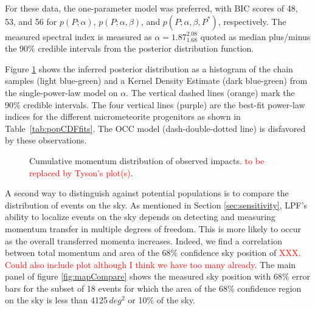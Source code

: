 \documentclass[twocolumn, trackchanges]{aastex62}
\newcommand{\red}[1]{\textcolor{red}{#1}}
\begin{document}
For these data, the one-parameter model was preferred, with BIC scores of 48, 53, and 56  for $p(P;\alpha)$, $p(P;\alpha,\beta)$, and $p(P;\alpha,\beta,P^*)$, respectively. The measured spectral index is measured as
$\alpha = 1.87^{2.08}_{1.68}$ 
quoted as median plus/minus the 90\% credible intervals from the posterior distribution function.

Figure \ref{fig:PDF_P} shows the inferred posterior distribution as a histogram of the chain samples (light blue-green) and a Kernel Density Estimate (dark blue-green) from the single-power-law model on $\alpha$. The vertical dashed lines (orange) mark the 90\% credible intervals.  The four vertical lines (purple) are the best-fit power-law indices for the different micrometeorite progenitors as shown in Table~\ref{tab:popCDFfits}. The OCC model (dash-double-dotted line) is disfavored by these observations.



\begin{figure}[h!]
\vspace*{-8mm}
\caption{Cumulative momentum distribution of observed impacts. \red{to be replaced by Tyson's plot(s)}. \label{fig:PDF_P}}
\end{figure}

A second way to distinguish against potential populations is to compare the distribution of events on the sky.  As mentioned in Section \ref{sec:sensitivity}, LPF's ability to localize events on the sky depends on detecting and measuring momentum transfer in multiple degrees of freedom. This is more likely to occur as the overall transferred momenta increases. Indeed, we find a correlation between total momentum and area of the 68\% confidence sky position of \red{XXX. Could also include plot although I think we have too many already}. The main panel of figure \ref{fig:mapCompare} shows the measured sky position with 68\% error bars for the subset of 18 events for which the area of the 68\% confidence region on the sky is less than 4125$\,deg^2$ or 10\% of the sky. 
\end{document}
